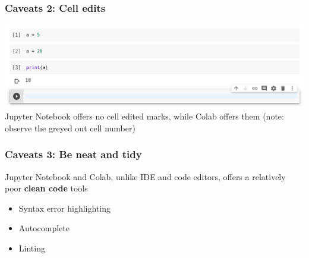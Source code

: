 \documentclass[aspectratio=169]{beamer}
\begin{document}
\begin{frame}
    \frametitle{Caveats 2: Cell edits}
    \includegraphics[width=\textwidth]{images/colab-edited-cells.png}
    \pause
    Jupyter Notebook offers no cell edited marks, while Colab offers them
    \pause
    (note: observe the greyed out cell number)
\end{frame}

\begin{frame}
    \frametitle{Caveats 3: Be neat and tidy}
    Jupyter Notebook and Colab, unlike IDE and code editors, offers a relatively poor \textbf{clean code} tools
    \begin{itemize}
        \item Syntax error highlighting
        \item Autocomplete
        \item Linting
    \end{itemize}
\end{frame}
\end{document}
